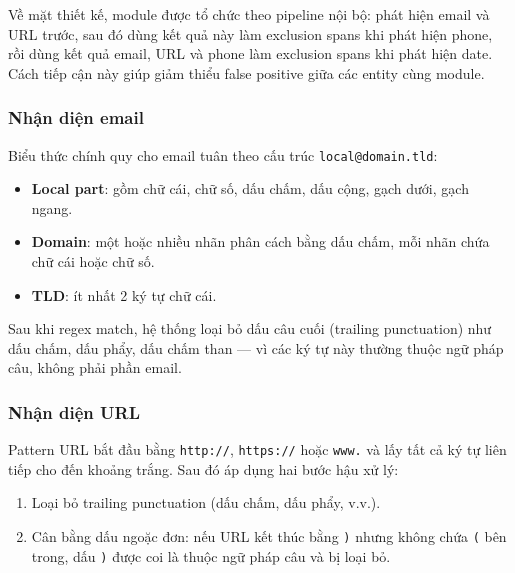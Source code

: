 Về mặt thiết kế, module được tổ chức theo pipeline nội bộ: phát hiện email và
URL trước, sau đó dùng kết quả này làm exclusion spans khi phát hiện phone,
rồi dùng kết quả email, URL và phone làm exclusion spans khi phát hiện date.
Cách tiếp cận này giúp giảm thiểu false positive giữa các entity cùng module.

\subsubsection{Nhận diện email}

Biểu thức chính quy cho email tuân theo cấu trúc \texttt{local@domain.tld}:

\begin{itemize}[nosep]
      \item \textbf{Local part}: gồm chữ cái, chữ số, dấu chấm, dấu cộng, gạch
            dưới, gạch ngang.
      \item \textbf{Domain}: một hoặc nhiều nhãn phân cách bằng dấu chấm, mỗi
            nhãn chứa chữ cái hoặc chữ số.
      \item \textbf{TLD}: ít nhất 2 ký tự chữ cái.
\end{itemize}

Sau khi regex match, hệ thống loại bỏ dấu câu cuối (trailing punctuation) như
dấu chấm, dấu phẩy, dấu chấm than --- vì các ký tự này thường thuộc ngữ pháp
câu, không phải phần email.

\subsubsection{Nhận diện URL}

Pattern URL bắt đầu bằng \texttt{http://}, \texttt{https://} hoặc \texttt{www.}
và lấy tất cả ký tự liên tiếp cho đến khoảng trắng. Sau đó áp dụng hai bước
hậu xử lý:

\begin{enumerate}[nosep]
      \item Loại bỏ trailing punctuation (dấu chấm, dấu phẩy, v.v.).
      \item Cân bằng dấu ngoặc đơn: nếu URL kết thúc bằng \texttt{)} nhưng
            không chứa \texttt{(} bên trong, dấu \texttt{)} được coi là thuộc
            ngữ pháp câu và bị loại bỏ.
\end{enumerate}

